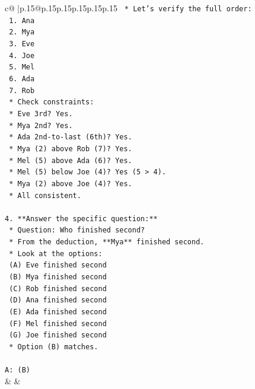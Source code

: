 \documentclass{article}
\begin{document}
{\begin{supertabular}{c@{$\;$}|p{.15\linewidth}@{}p{.15\linewidth}p{.15\linewidth}p{.15\linewidth}p{.15\linewidth}p{.15\linewidth}}
{{{\texttt{                    *   Let's verify the full order:} \\
\texttt{                        1.  Ana} \\
\texttt{                        2.  Mya} \\
\texttt{                        3.  Eve} \\
\texttt{                        4.  Joe} \\
\texttt{                        5.  Mel} \\
\texttt{                        6.  Ada} \\
\texttt{                        7.  Rob} \\
\texttt{                    *   Check constraints:} \\
\texttt{                        *   Eve 3rd? Yes.} \\
\texttt{                        *   Mya 2nd? Yes.} \\
\texttt{                        *   Ada 2nd{-}to{-}last (6th)? Yes.} \\
\texttt{                        *   Mya (2) above Rob (7)? Yes.} \\
\texttt{                        *   Mel (5) above Ada (6)? Yes.} \\
\texttt{                        *   Mel (5) below Joe (4)? Yes (5 > 4).} \\
\texttt{                        *   Mya (2) above Joe (4)? Yes.} \\
\texttt{                    *   All consistent.} \\
\\ 
\texttt{4.  **Answer the specific question:**} \\
\texttt{    *   Question: Who finished second?} \\
\texttt{    *   From the deduction, **Mya** finished second.} \\
\texttt{    *   Look at the options:} \\
\texttt{        (A) Eve finished second} \\
\texttt{        (B) Mya finished second} \\
\texttt{        (C) Rob finished second} \\
\texttt{        (D) Ana finished second} \\
\texttt{        (E) Ada finished second} \\
\texttt{        (F) Mel finished second} \\
\texttt{        (G) Joe finished second} \\
\texttt{    *   Option (B) matches.} \\
\\ 
\texttt{A: (B)} \\
            }
        }
    }
    & & \\ \\


\end{supertabular}}
\end{document}
